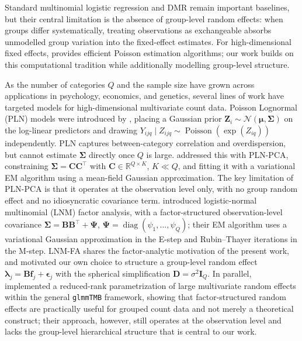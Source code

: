 Standard multinomial logistic regression and DMR remain important baselines, but their central limitation is the absence of group-level random effects: when groups differ systematically, treating observations as exchangeable absorbs unmodelled group variation into the fixed-effect estimates. For high-dimensional fixed effects, \citet{Correia2020} provides efficient Poisson estimation algorithms; our work builds on this computational tradition while additionally modelling group-level structure.

As the number of categories $Q$ and the sample size have grown across applications in psychology, economics, and genetics, several lines of work have targeted models for high-dimensional multivariate count data.
Poisson Lognormal (PLN) models were introduced by \citet{Aitchison1989}, placing a Gaussian prior $\mathbf{Z}_i\sim\mathcal{N}(\bm\mu,\bm\Sigma)$ on the log-linear predictors and drawing $Y_{ijq}\mid Z_{ijq}\sim\operatorname{Poisson}(\exp(Z_{iq}))$ independently. PLN captures between-category correlation and overdispersion, but cannot estimate $\bm\Sigma$ directly once $Q$ is large. \citet{Chiquet2018} addressed this with PLN-PCA, constraining $\bm\Sigma=\mathbf{C}\mathbf{C}^\top$ with $\mathbf{C}\in\mathbb{R}^{Q\times K}$, $K\ll Q$, and fitting it with a variational EM algorithm using a mean-field Gaussian approximation. The key limitation of PLN-PCA is that it operates at the observation level only, with no group random effect and no idiosyncratic covariance term. \citet{Tu2023} introduced logistic-normal multinomial (LNM) factor analysis, with a factor-structured observation-level covariance $\bm\Sigma=\mathbf{B}\mathbf{B}^\top+\bm\Psi$, $\bm\Psi=\operatorname{diag}(\psi_1,\dots,\psi_Q)$; their EM algorithm uses a variational Gaussian approximation in the E-step and Rubin--Thayer iterations \citep{Rubin1982} in the M-step. LNM-FA shares the factor-analytic motivation of the present work, and motivated our own choice to structure a group-level random effect $\bm\lambda_j=\mathbf{B}\mathbf{f}_j+\bm\epsilon_j$ with the spherical simplification $\mathbf{D}=\sigma^2\mathbf{I}_Q$. In parallel, \citet{mcgillycuddy2024} implemented a reduced-rank parametrization of large multivariate random effects within the general \texttt{glmmTMB} framework, showing that factor-structured random effects are practically useful for grouped count data and not merely a theoretical construct; their approach, however, still operates at the observation level and lacks the group-level hierarchical structure that is central to our work.

